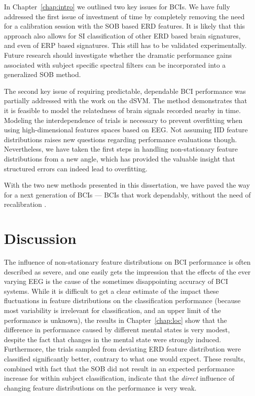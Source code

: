 \begin{sloppypar}
In Chapter~\ref{chap:intro} we outlined two key issues for \acp{BCI}. We have
fully addressed the first issue of investment of time by completely removing
the need for a calibration session with the \ac{SOB} based \ac{ERD} features.
It is likely that this approach also allows for \acl{SI} classification of
other \ac{ERD} based brain signatures, and even of \ac{ERP} based signatures.
This still has to be validated experimentally. Future research should
investigate whether the dramatic performance gains associated with subject
specific spectral filters \cite{blankertz2008bbc} can be incorporated into a
generalized \ac{SOB} method.
 
The second key issue of requiring predictable, dependable \ac{BCI} performance
was partially addressed with the work on the \ac{dSVM}. The method demonstrates
that it is feasible to model the relatedness of brain signals recorded nearby
in time. Modeling the interdependence of trials is necessary to prevent
overfitting when using high-dimensional features spaces based on \ac{EEG}. Not
assuming \ac{IID} feature distributions raises new questions regarding
performance evaluations though. Nevertheless, we have taken the first steps in
handling non-stationary feature distributions from a new angle, which has
provided the valuable insight that structured errors can indeed lead to
overfitting. 
\end{sloppypar}

With the two new methods presented in this dissertation, we have paved the way
for a next generation of \acp{BCI} --- \acp{BCI} that work dependably, without
the need of recalibration .

\section{Discussion}
The influence of non-stationary feature distributions on \ac{BCI}
performance is often described as severe, and one easily gets the
impression that the effects of the ever varying \ac{EEG} is the cause of the
sometimes disappointing accuracy of \ac{BCI} systems.
%
While it is difficult to get a clear estimate of the impact these fluctuations
in feature distributions  on the classification performance (because most
variability is irrelevant for classification, and an upper limit of the
performance is unknown), the results in Chapter~\ref{chap:loc} show that the
difference in performance caused by different mental states is very modest,
despite the fact that changes in the mental state were strongly induced.
Furthermore, the trials sampled from deviating \ac{ERD} feature distribution
were classified significantly better, contrary to what one would expect. These
results, combined with fact that the \ac{SOB} did not result in an expected
performance increase for within subject classification, indicate that the
\emph{direct} influence of changing feature distributions on the performance is
very weak.

